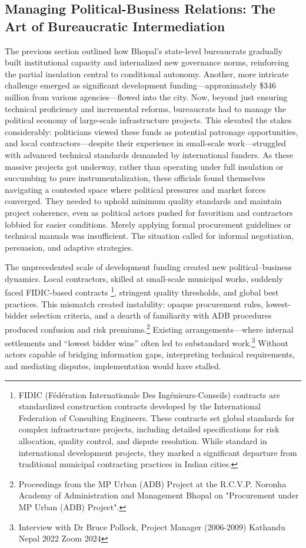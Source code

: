 \subsection{Managing Political-Business Relations: The Art of Bureaucratic Intermediation}

The previous section outlined how Bhopal’s state-level bureaucrats gradually built institutional capacity and internalized new governance norms, reinforcing the partial insulation central to conditional autonomy. Another, more intricate challenge emerged as significant development funding—approximately \$346 million from various agencies—flowed into the city. Now, beyond just ensuring technical proficiency and incremental reforms, bureaucrats had to manage the political economy of large-scale infrastructure projects. This elevated the stakes considerably: politicians viewed these funds as potential patronage opportunities, and local contractors—despite their experience in small-scale work—struggled with advanced technical standards demanded by international funders. As these massive projects got underway, rather than operating under full insulation or succumbing to pure instrumentalization, these officials found themselves navigating a contested space where political pressures and market forces converged. They needed to uphold minimum quality standards and maintain project coherence, even as political actors pushed for favoritism and contractors lobbied for easier conditions. Merely applying formal procurement guidelines or technical manuals was insufficient. The situation called for informal negotiation, persuasion, and adaptive strategies.

The unprecedented scale of development funding created new political–business dynamics.  Local contractors, skilled at small-scale municipal works, suddenly faced FIDIC-based contracts \footnote{FIDIC (Fédération Internationale Des Ingénieurs-Conseils) contracts are standardized construction contracts developed by the International Federation of Consulting Engineers. These contracts set global standards for complex infrastructure projects, including detailed specifications for risk allocation, quality control, and dispute resolution. While standard in international development projects, they marked a significant departure from traditional municipal contracting practices in Indian cities.}, stringent quality thresholds, and global best practices. This mismatch created instability: opaque procurement rules, lowest-bidder selection criteria, and a dearth of familiarity with ADB procedures produced confusion and risk premiums.\footnote{Proceedings from the MP Urban (ADB) Project at the R.C.V.P. Noronha Academy of Administration and Management Bhopal on "Procurement under MP Urban (ADB) Project".} Existing arrangements—where internal settlements and “lowest bidder wins” often led to substandard work.\footnote{Interview with Dr Bruce Pollock, Project Manager (2006-2009) Kathandu Nepal 2022 Zoom 2024} Without actors capable of bridging information gaps, interpreting technical requirements, and mediating disputes, implementation would have stalled.

